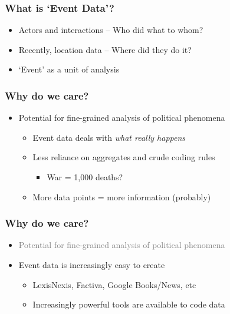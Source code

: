 \documentclass{beamer}
\begin{document}
\begin{frame}
\frametitle{What is `Event Data'?}
\begin{itemize}
\item Actors and interactions -- Who did what to whom?
\vspace {5 mm}
\item Recently, location data -- Where did they do it?
\vspace {5 mm}
\item `Event' as a unit of analysis

\end{itemize}
\end{frame}

\begin{frame}
\frametitle{Why do we care?}
\begin{itemize}
\item Potential for fine-grained analysis of political phenomena
\begin{itemize}
\item Event data deals with \textit{what really happens}
\vspace {2 mm}
\item Less reliance on aggregates and crude coding rules 
\begin{itemize}
\item War = 1,000 deaths?
\end{itemize}
\vspace {2 mm}
\item More data points = more information (probably)
\end{itemize}

\end{itemize}
\end{frame}


\begin{frame}
\frametitle{Why do we care?}
\begin{itemize}
\item \textcolor{gray}{Potential for fine-grained analysis of political phenomena}
\vspace {2 mm}
\item Event data is increasingly easy to create
\begin{itemize}
\item LexisNexis, Factiva, Google Books/News, etc
\vspace {2 mm}
\item Increasingly powerful tools are available to code data
\end{itemize}

\end{itemize}
\end{frame}
\end{document}

